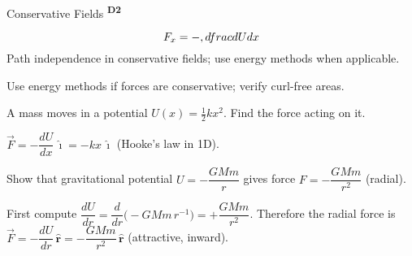 ﻿\documentclass[12pt,a4paper]{article}
\providecommand{\KPFormulas}{}
\providecommand{\KPHeuristics}{}
\providecommand{\KPProblems}{}
\newcommand{\DTwo}{\texorpdfstring{\textsuperscript{\textbf{D2}}}{ D2}}
\begin{document}
\begin{KnowledgePoint}{Conservative Fields \DTwo}
  \KPFormulas
\begin{formulabox}
  \[
  F_x=-\\,\\dfrac{dU}{dx}
  \]
  Path independence in conservative fields; use energy methods when applicable.
  \end{formulabox}

  \KPHeuristics
  \begin{heuristicsbox}
  Use energy methods if forces are conservative; verify curl-free areas.
  \end{heuristicsbox}

  \KPProblems
\begin{cheatproblem}
  A mass moves in a potential $U(x)=\tfrac12 kx^2$. Find the force acting on it.
\begin{solutionbox}
  $\vec F=-\dfrac{dU}{dx}\,\hat\imath=-kx\,\hat\imath$ (Hooke's law in 1D).
\end{solutionbox}
\end{cheatproblem}
\begin{cheatproblem}
  Show that gravitational potential $U=-\dfrac{GMm}{r}$ gives force $F=-\dfrac{GMm}{r^2}$ (radial).
\begin{solutionbox}
  First compute $\dfrac{dU}{dr}=\dfrac{d}{dr}\Big(-GMm\,r^{-1}\Big)=+\dfrac{GMm}{r^2}$. Therefore the radial force is $\vec F=-\dfrac{dU}{dr}\,\hat{\mathbf r}=-\dfrac{GMm}{r^2}\,\hat{\mathbf r}$ (attractive, inward).
\end{solutionbox}
\end{cheatproblem}
\end{KnowledgePoint}

\end{document}
